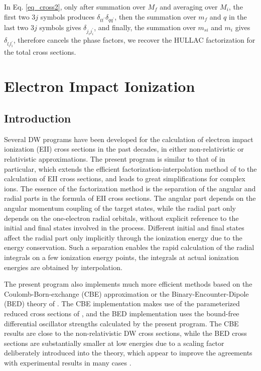 In Eq. \ref{eq_cross2},
only after summation over $M_f$ and averaging over $M_i$, the first two 
$3j$ symbols produces $\delta_{tt^\prime}\delta_{qq^\prime}$, then
the summation over $m_f$ and $q$ in the last two $3j$ symbols gives
$\delta_{j_i j_i^\prime}$, and finally, the summation over $m_{si}$ and
$m_i$ gives $\delta_{l_i l_i^\prime}$,
therefore cancels the phase factors, we recover the HULLAC factorization 
for the total cross sections.













\section{Electron Impact Ionization}
\subsection{Introduction}
Several DW programs have been developed for the calculation of
electron impact ionization
(EII) cross
sections in the past decades, in either non-relativistic \cite{younger80} or
relativistic \cite{pindzola88, sampson91} approximations. The present program
is similar to that of \citet{sampson91} in particular,  which extends the
efficient factorization-interpolation method of \citet{barshalom:1988a} to the
calculation of EII cross sections, and leads to great simplifications for
complex ions. The essence of the factorization method is the separation of
the angular and radial parts in the formula of EII cross sections. The angular
part depends on the angular momentum coupling of the target states, while the
radial part only depends on the one-electron radial orbitals, without
explicit reference to the initial and final states involved in the
process. Different initial and final states affect the radial part only
implicitly through the ionization energy due to the energy conservation. Such
a separation enables the rapid calculation of the radial integrals on a few
ionization energy points, the integrals at actual ionization energies are
obtained by interpolation.  

The present program also implements much more efficient methods based on the
Coulomb-Born-exchange (CBE) approximation or the Binary-Encounter-Dipole (BED)
theory of \citet{kim94}. The CBE implementation makes use of the parameterized
reduced cross sections of \citet{golden:1977a, golden:1980a}, and the BED
implementation uses the bound-free differential oscillator strengths calculated
by the present program. The CBE results are close to the non-relativistic DW
cross sections, while the BED cross sections are substantially smaller at low
energies due to a scaling factor deliberately introduced into the theory, which
appear to improve the agreements with experimental results in many cases
\cite{kim94}.
 
